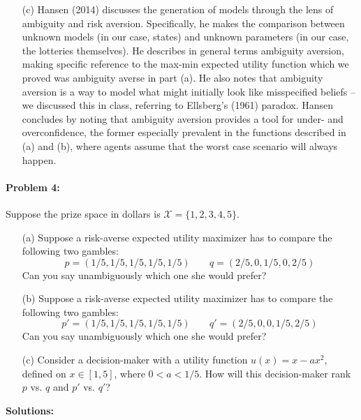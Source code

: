 \documentclass[12pt]{article}
\begin{document}
\begin{itemize}
    \item[(c)] Hansen (2014) discusses the generation of models through the lens of ambiguity and risk aversion. Specifically, he makes the comparison between unknown models (in our case, states) and unknown parameters (in our case, the lotteries themselves). He describes in general terms ambiguity aversion, making specific reference to the max-min expected utility function which we proved was ambiguity averse in part (a). He also notes that ambiguity aversion is a way to model what might initially look like misspecified beliefs -- we discussed this in class, referring to Ellsberg's (1961) paradox. Hansen concludes by noting that ambiguity aversion provides a tool for under- and overconfidence, the former especially prevalent in the functions described in (a) and (b), where agents assume that the worst case scenario will always happen. 
\end{itemize}

\paragraph{Problem 4:} Suppose the prize space in dollars is $\mathcal{X} = \{1,2,3,4,5\}$. 

\begin{itemize}
    \item[(a)] Suppose a risk-averse expected utility maximizer has to compare the following two gambles:
    \[
    p = (1/5,1/5,1/5,1/5,1/5) \;\;\;\;\;\;\; q = (2/5,0,1/5,0,2/5)
    \]
    Can you say unambiguously which one she would prefer?

    \item[(b)] Suppose a risk-averse expected utility maximizer has to compare the following two gambles:
    \[
    p' = (1/5,1/5,1/5,1/5,1/5) \;\;\;\;\;\;\; q' = (2/5,0,0,1/5,2/5)
    \]
    Can you say unambiguously which one she would prefer?

    \item[(c)] Consider a decision-maker with a utility function $u(x) = x - ax^2$, defined on $x \in [1,5]$, where $0 < a < 1/5$. How will this decision-maker rank $p$ vs. $q$ and $p'$ vs. $q'$?
\end{itemize}
\medskip
\textbf{Solutions:}
\end{document}
